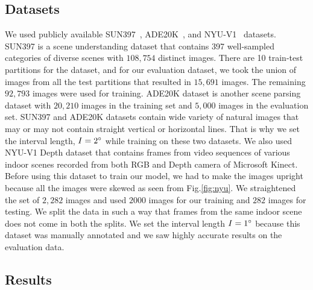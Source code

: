 \documentclass{bmvc2k}
\def\etal{\emph{et al}\bmvaOneDot}
\begin{document}
\subsection{Datasets}
\label{sec:datasets}
We used publicly available SUN397~\cite{sun397}, ADE20K~\cite{ade20k}, and NYU-V1~\cite{nyuv1} datasets. SUN397 is a scene understanding dataset that contains 397 well-sampled categories of diverse scenes with $108,754$ distinct images. There are 10 train-test partitions for the dataset, and for our evaluation dataset, we took the union of images from all the test partitions that resulted in $15,691$ images. The remaining $92,793$ images were used for training. ADE20K dataset is another scene parsing dataset with $20,210$ images in the training set and $5,000$ images in the evaluation set. SUN397 and ADE20K datasets contain wide variety of natural images that may or may not contain straight vertical or horizontal lines. That is why we set the interval length, $I=2\degree$ while training on these two datasets. 
We also used NYU-V1 Depth dataset that contains frames from video sequences of various indoor scenes recorded from both RGB and Depth camera of Microsoft Kinect. 
Before using this dataset to train our model, we had to make the images upright because all the images were skewed as seen from Fig.\ref{fig:nyu}. We straightened the set of $2,282$ images and used $2000$ images for our training and $282$ images for testing. We split the data in such a way that frames from the same indoor scene does not come in both the splits. We set the interval length $I=1\degree$ because this dataset was manually annotated and we saw highly accurate results on the evaluation data. 

\subsection{Results}
\label{sec:results}
\end{document}
